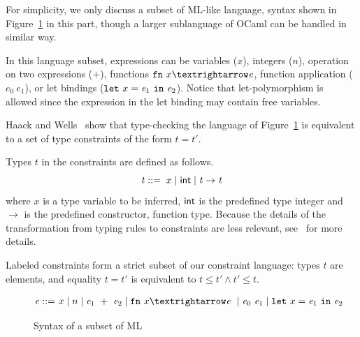 For simplicity, we only discuss a subset of ML-like language, syntax shown in
Figure~\ref{figure:mltypes} in this part, though a larger sublanguage
of OCaml can be handled in similar way.

\newcommand\expr{\mathit{e}}
\newcommand\ty{\mathit{t}}

In this language subset, expressions can be variables ($x$), integers
($n$), operation on two expressions ($+$), functions $\fn~x→\expr$,
function application ($\expr_0~\expr_1$), or let bindings
($\kwlet x = \expr_1 \kwin \expr_2$). Notice that
let-polymorphism is allowed since the expression in the let binding
may contain free variables.

Haack and Wells~\cite{haack:slicing} show that type-checking the
language of Figure~\ref{figure:mltypes} is equivalent to a set of
type constraints of the form $\ty = \ty'$.

Types $\ty$ in the constraints are defined as follows.
\[\ty ::=\; x \mid \atom{int} \mid \ty \rightarrow \ty\]
\noindent where $x$ is a type variable to be inferred, $\textsf{int}$ is the predefined type integer and
$\rightarrow$ is the predefined constructor, function type. Because
the details of the
transformation from typing rules to constraints
are less relevant, see~\cite{haack:slicing} for more details. 

Labeled constraints form a strict subset of our constraint
language:
types $\ty$ are elements, and equality $\ty=\ty'$ is equivalent to
$\ty\leq \ty' \land \ty'\leq \ty$. 

\begin{figure}
\begin{minipage}{2in}
\begin{align*}
\expr ::=  & x \mid n \mid \expr_1 + \expr_2 \mid \fn x → \expr \mid
\expr_0  \expr_1 \mid \kwlet x =
\expr_1  \kwin  \expr_2  \\
\end{align*}
\end{minipage}
\caption{Syntax of a subset of ML}
\label{figure:mltypes}
\end{figure}


% 


